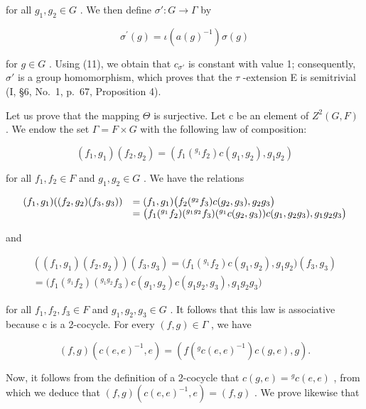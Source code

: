 for all \(g_{1}, g_{2} \in G\) . We then define \(\sigma' : G \to \Gamma\) by

\[
\sigma^ {\prime} (g) = \iota (a (g) ^ {- 1}) \sigma (g)
\]

for \(g \in G\) . Using (11), we obtain that \(c_{\sigma'}\) is constant with value 1; consequently, \(\sigma'\) is a group homomorphism, which proves that the \(\tau\) -extension E is semitrivial (I, §6, No.~1, p.~67, Proposition 4).

Let us prove that the mapping \(\Theta\) is surjective. Let c be an element of \(Z^{2}(G,F)\) . We endow the set \(\Gamma = F \times G\) with the following law of composition:

\[
(f _ {1}, g _ {1}) (f _ {2}, g _ {2}) = \left(f _ {1} (^ {g _ {1}} f _ {2}) c (g _ {1}, g _ {2}), g _ {1} g _ {2}\right)\tag{12}
\]

for all \(f_{1}, f_{2} \in F\) and \(g_{1}, g_{2} \in G\) . We have the relations

\[
\begin{array}{r l} (f _ {1}, g _ {1}) ((f _ {2}, g _ {2}) (f _ {3}, g _ {3})) & = (f _ {1}, g _ {1}) \big (f _ {2} (^ {g _ {2}} f _ {3}) c (g _ {2}, g _ {3}), g _ {2} g _ {3} \big) \\ & = \big (f _ {1} (^ {g _ {1}} f _ {2}) (^ {g _ {1} g _ {2}} f _ {3}) (^ {g _ {1}} c (g _ {2}, g _ {3})) c (g _ {1}, g _ {2} g _ {3}), g _ {1} g _ {2} g _ {3} \big) \end{array}
\]

and

\[
\begin{array}{c} ((f _ {1}, g _ {1}) (f _ {2}, g _ {2}))   (f _ {3}, g _ {3}) = \big (f _ {1} (^ {g _ {1}} f _ {2}) c (g _ {1}, g _ {2}), g _ {1} g _ {2} \big) (f _ {3}, g _ {3}) \\ = \big (f _ {1} (^ {g _ {1}} f _ {2}) (^ {g _ {1} g _ {2}} f _ {3}) c (g _ {1}, g _ {2}) c (g _ {1} g _ {2}, g _ {3}), g _ {1} g _ {2} g _ {3} \big) \end{array}
\]

for all \(f_{1}, f_{2}, f_{3} \in F\) and \(g_{1}, g_{2}, g_{3} \in G\) . It follows that this law is associative because c is a 2-cocycle. For every \((f, g) \in \Gamma\) , we have

\[
(f, g) (c (e, e) ^ {- 1}, e) = (f (^ {g} c (e, e) ^ {- 1}) c (g, e), g).
\]

Now, it follows from the definition of a 2-cocycle that \(c(g, e) = {}^g c(e, e)\) , from which we deduce that \((f, g)(c(e, e)^{-1}, e) = (f, g)\) . We prove likewise that

